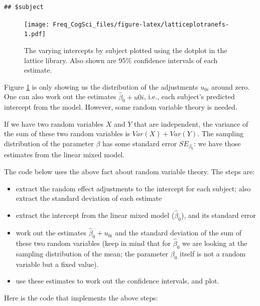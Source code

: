 \documentclass[
  12pt,
]{krantz}
\providecommand{\tightlist}{%
  \setlength{\itemsep}{0pt}\setlength{\parskip}{0pt}}
\theoremstyle{definition}
\theoremstyle{definition}
\theoremstyle{definition}
\theoremstyle{definition}
\theoremstyle{remark}
\begin{document}
\begin{verbatim}
## $subject
\end{verbatim}

\begin{figure}
\centering
\texttt{[image: Freq\_CogSci\_files/figure-latex/latticeplotranefs-1.pdf]}
\caption{\label{fig:latticeplotranefs}The varying intercepts by subject plotted using the dotplot in the lattice library. Also shown are 95\% confidence intervals of each estimate.}
\end{figure}

Figure \ref{fig:latticeplotranefs} is only showing us the distribution of the adjustments \(u_{0i}\) around zero. One can also work out the estimates \(\hat\beta_0 + u{0i}\), i.e., each subject's predicted intercept from the model. However, some random variable theory is needed.

If we have two random variables \(X\) and \(Y\) that are independent, the variance of the sum of these two random variables is \(Var(X) + Var(Y)\). The sampling distribution of the parameter \(\beta\) has some standard error \(SE_{\beta_0}\): we have those estimates from the linear mixed model.

The code below uses the above fact about random variable theory. The steps are:

\begin{itemize}
\tightlist
\item
  extract the random effect adjustments to the intercept for each subject; also extract the standard deviation of each estimate
\item
  extract the intercept from the linear mixed model (\(\hat\beta_0\)), and its standard error
\item
  work out the estimates \(\hat\beta_0 + u_{0i}\) and the standard deviation of the sum of these two random variables (keep in mind that for \(\hat\beta_0\) we are looking at the sampling distribution of the mean; the parameter \(\beta_0\) itself is not a random variable but a fixed value).
\item
  use these estimates to work out the confidence intervals, and plot.
\end{itemize}

Here is the code that implements the above steps:
\end{document}
